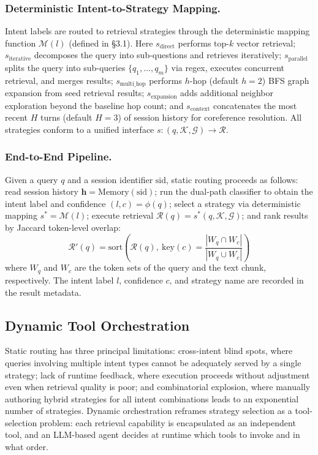\documentclass[runningheads]{llncs}
\begin{document}
\subsubsection{Deterministic Intent-to-Strategy Mapping.}

Intent labels are routed to retrieval strategies through the deterministic mapping function $\mathcal{M}(l)$ (defined in \S3.1). Here $s_{\text{direct}}$ performs top-$k$ vector retrieval; $s_{\text{iterative}}$ decomposes the query into sub-questions and retrieves iteratively; $s_{\text{parallel}}$ splits the query into sub-queries $\{q_1, \ldots, q_m\}$ via regex, executes concurrent retrieval, and merges results; $s_{\text{multi\_hop}}$ performs $h$-hop (default $h=2$) BFS graph expansion from seed retrieval results; $s_{\text{expansion}}$ adds additional neighbor exploration beyond the baseline hop count; and $s_{\text{context}}$ concatenates the most recent $H$ turns (default $H=3$) of session history for coreference resolution. All strategies conform to a unified interface $s: (q, \mathcal{K}, \mathcal{G}) \to \mathcal{R}$.

\subsubsection{End-to-End Pipeline.}

Given a query $q$ and a session identifier $\text{sid}$, static routing proceeds as follows: read session history $\mathbf{h} = \text{Memory}(\text{sid})$; run the dual-path classifier to obtain the intent label and confidence $(l, c) = \phi(q)$; select a strategy via deterministic mapping $s^* = \mathcal{M}(l)$; execute retrieval $\mathcal{R}(q) = s^*(q, \mathcal{K}, \mathcal{G})$; and rank results by Jaccard token-level overlap:
\begin{equation}
    \mathcal{R}'(q) = \text{sort}\!\left(\mathcal{R}(q),\ \text{key}(c) = \frac{|W_q \cap W_c|}{|W_q \cup W_c|}\right)
\end{equation}
where $W_q$ and $W_c$ are the token sets of the query and the text chunk, respectively. The intent label $l$, confidence $c$, and strategy name are recorded in the result metadata.

\subsection{Dynamic Tool Orchestration}

Static routing has three principal limitations: cross-intent blind spots, where queries involving multiple intent types cannot be adequately served by a single strategy; lack of runtime feedback, where execution proceeds without adjustment even when retrieval quality is poor; and combinatorial explosion, where manually authoring hybrid strategies for all intent combinations leads to an exponential number of strategies. Dynamic orchestration reframes strategy selection as a tool-selection problem: each retrieval capability is encapsulated as an independent tool, and an LLM-based agent decides at runtime which tools to invoke and in what order.
\end{document}
